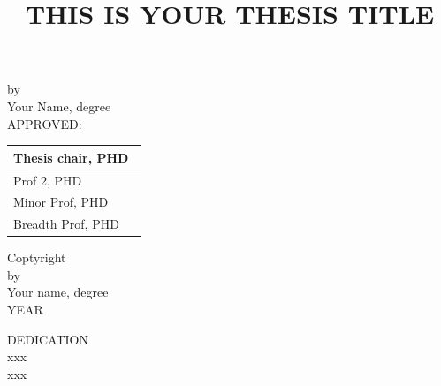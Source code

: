\documentclass[12pt]{article}
\begin{document}
%
\begin{titlepage}
\title{\normalsize THIS IS YOUR THESIS TITLE}
\date{}
\maketitle

{\normalsize
\begin{center}
by\\[5mm]
Your Name, degree\\[10mm]
APPROVED:\\[10mm]
\end{center}}

\begin{table}[h]
\begin{flushright}
\begin{tabular}{ p{8cm}}

\hline
Thesis chair, PHD\ \\[0.8cm]
\hline
Prof 2, PHD\\[0.8cm]
\hline
Minor Prof, PHD\\[0.8cm]
\hline
Breadth Prof, PHD\\[0.8cm]


\end{tabular}
\end{flushright}
\label{default}
\end{table}

\thispagestyle{empty}
\pagestyle{empty}
\end{titlepage}

\newpage
\thispagestyle{empty}
\begin{center}
Coptyright\\
by\\
Your name, degree\\
YEAR
\end{center}


\newpage
\thispagestyle{empty}
\doublespacing
\begin{center}
DEDICATION\\
xxx\\
xxx
\end{center}
\end{document}

